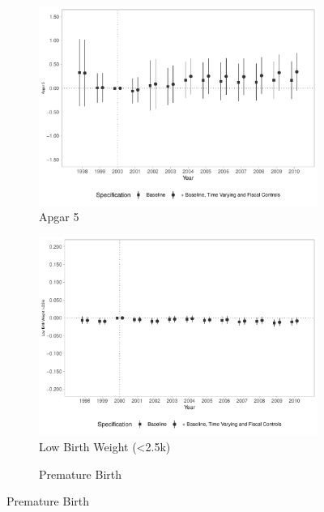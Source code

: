 \begin{figure}[h!]
\begin{center}
    \begin{subfigure}{0.32\textwidth}
        \centering
        \caption{\scriptsize Apgar 5}\label{fig:19c}
        \includegraphics[width=\textwidth]{plots/birth_apgar5_dist_ec29_baseline_dist_ec29_baseline_19.pdf}
    \end{subfigure}
    \begin{subfigure}{0.32\textwidth}
        \caption{\scriptsize Low Birth Weight (<2.5k)}\label{fig:19d}
        \centering
        \includegraphics[width=\textwidth]{plots/birth_low_weight_2500g_dist_ec29_baseline_dist_ec29_baseline_19.pdf}
    \end{subfigure}
    \begin{subfigure}{0.32\textwidth}
        \centering
        \caption{\scriptsize Premature Birth}\label{fig:19e}

\end{subfigure}
\end{center}
\end{figure}
